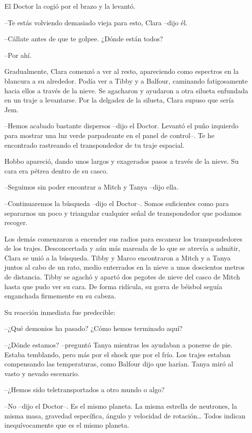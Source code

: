 {El Doctor la cogió por el brazo y la levantó.}

{--Te estás volviendo demasiado vieja para esto, Clara --dijo él.}

{--Cállate antes de que te golpee. ¿Dónde están todos?}

{--Por ahí.}

{Gradualmente, Clara comenzó a ver al resto, apareciendo como espectros
 en la blancura a su alrededor. Podía ver a Tibby y a Balfour, caminando
 fatigosamente hacia ellos a través de la nieve. Se agacharon y ayudaron
 a otra silueta enfundada en un traje a levantarse. Por la delgadez de la
silueta, Clara supuso que sería Jem.}

{--Hemos acabado bastante dispersos --dijo el Doctor. Levantó el puño
 izquierdo para mostrar una luz verde parpadeante en el panel de
 control--. Te he encontrado rastreando el transpondedor de tu traje
espacial.}

{Hobbo apareció, dando unos largos y exagerados pasos a través de la
nieve. Su cara era pétrea dentro de su casco.}

{--Seguimos sin poder encontrar a Mitch y Tanya --dijo ella.}

{--Continuaremos la búsqueda --dijo el Doctor--. Somos suficientes como
 para separarnos un poco y triangular cualquier señal de transpondedor
que podamos recoger.}

{Los demás comenzaron a encender sus radios para escanear los
 transpondedores de los trajes. Desconcertada y aún más mareada de lo que
 se atrevía a admitir, Clara se unió a la búsqueda. Tibby y Marco
 encontraron a Mitch y a Tanya juntos al cabo de un rato, medio
 enterrados en la nieve a unos doscientos metros de distancia. Tibby se
 agachó y apartó dos pegotes de nieve del casco de Mitch hasta que pudo
 ver su cara. De forma ridícula, su gorra de béisbol seguía enganchada
firmemente en su cabeza.}

{Su reacción inmediata fue predecible:}

{--¿Qué demonios ha pasado? ¿Cómo hemos terminado aquí?}

{--¿Dónde estamos? --preguntó Tanya mientras les ayudaban a ponerse de
 pie. Estaba temblando, pero más por el shock que por el frío. Los trajes
 estaban compensando las temperaturas, como Balfour dijo que harían.
Tanya miró al vasto y nevado escenario.}

{--¿Hemos sido teletransportados a otro mundo o algo?}

{--No --dijo el Doctor--. Es el mismo planeta. La misma estrella de
 neutrones, la misma masa, gravedad específica, ángulo y velocidad de
 rotación\ldots{} Todos indican inequívocamente que es el mismo
planeta.}

